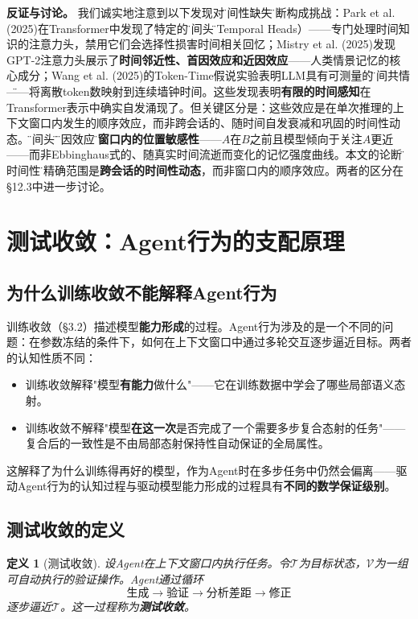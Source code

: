 \documentclass[11pt,a4paper]{ctexart}
\newtheorem{definition}[theorem]{定义}
\begin{document}
\textbf{反证与讨论。} 我们诚实地注意到以下发现对\"时间性缺失\"论断构成挑战：Park et al. (2025)在Transformer中发现了特定的\"时间头\"（Temporal Heads）——专门处理时间知识的注意力头，禁用它们会选择性损害时间相关回忆；Mistry et al. (2025)发现GPT-2注意力头展示了\textbf{时间邻近性、首因效应和近因效应}——人类情景记忆的核心成分；Wang et al. (2025)的Token-Time假说实验表明LLM具有可测量的\"时间共情\"——将离散token数映射到连续墙钟时间。这些发现表明\textbf{有限的时间感知}在Transformer表示中确实自发涌现了。但关键区分是：这些效应是在单次推理的上下文窗口内发生的顺序效应，而非跨会话的、随时间自发衰减和巩固的时间性动态。\"时间头\"和\"近因效应\"是\textbf{窗口内的位置敏感性}——$A$在$B$之前且模型倾向于关注$A$更近——而非Ebbinghaus式的、随真实时间流逝而变化的记忆强度曲线。本文的论断\"无时间性\"的精确范围是\textbf{跨会话的时间性动态}，而非窗口内的顺序效应。两者的区分在§12.3中进一步讨论。


\section{测试收敛：Agent行为的支配原理}

\subsection{为什么训练收敛不能解释Agent行为}

训练收敛（§3.2）描述模型\textbf{能力形成}的过程。Agent行为涉及的是一个不同的问题：在参数冻结的条件下，如何在上下文窗口中通过多轮交互逐步逼近目标。两者的认知性质不同：

\begin{itemize}[leftmargin=*]
    \item 训练收敛解释"模型\textbf{有能力}做什么"——它在训练数据中学会了哪些局部语义态射。
    \item 训练收敛不解释"模型\textbf{在这一次}是否完成了一个需要多步复合态射的任务"——复合后的一致性是不由局部态射保持性自动保证的全局属性。
\end{itemize}

这解释了为什么训练得再好的模型，作为Agent时在多步任务中仍然会偏离——驱动Agent行为的认知过程与驱动模型能力形成的过程具有\textbf{不同的数学保证级别}。

\subsection{测试收敛的定义}

\begin{definition}[测试收敛]
    设Agent在上下文窗口内执行任务。令$\mathcal{T}$为目标状态，$\mathcal{V}$为一组可自动执行的验证操作。Agent通过循环
    \[
    \text{生成} \longrightarrow \text{验证} \longrightarrow \text{分析差距} \longrightarrow \text{修正}
    \]
    逐步逼近$\mathcal{T}$。这一过程称为\textbf{测试收敛}。
\end{definition}
\end{document}
